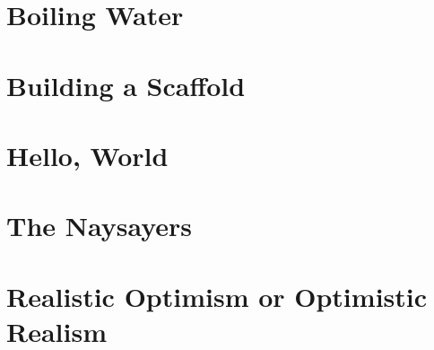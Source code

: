 \documentclass[12pt]{memoir}
\begin{document}
		
	\chapter{Boiling Water}
	
	\chapter{Building a Scaffold}
	
	\chapter{Hello, World}
	
	\chapter{The Naysayers}
	
	\chapter{Realistic Optimism or Optimistic Realism}
	
	
	
	
\end{document}
